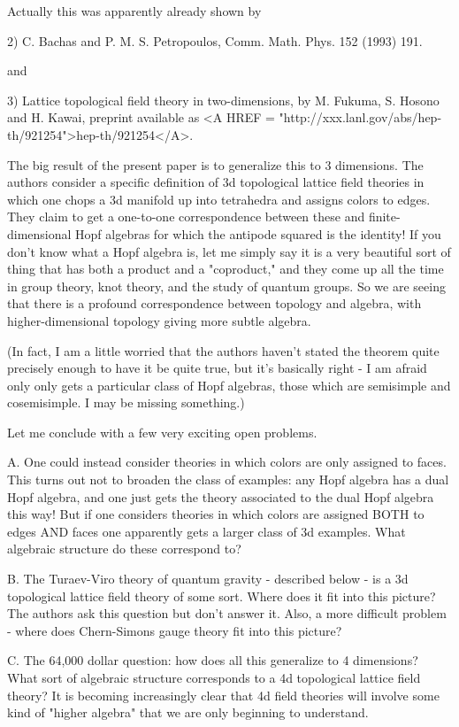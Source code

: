 Actually this was apparently already shown by 

2) C. Bachas and P. M. S. Petropoulos, Comm. Math. Phys. 152 (1993) 191.

and

3) Lattice topological field theory in two-dimensions, by M. Fukuma, S.
Hosono and H. Kawai, preprint available as <A HREF = "http://xxx.lanl.gov/abs/hep-th/921254">hep-th/921254</A>.

The big result of the present paper is to generalize this to 3 dimensions.
The authors consider a specific definition of 3d topological lattice
field theories in which one chops a 3d manifold up into tetrahedra and
assigns colors to edges.  They claim to get a one-to-one correspondence 
between these and finite-dimensional Hopf algebras for which the
antipode squared is the identity!   If you don't know what a Hopf
algebra is, let me simply say it is a very beautiful sort of thing that
has both a product and a "coproduct," and they come up all the time in
group theory, knot theory, and the study of quantum groups.  So we are
seeing that there is a profound correspondence between topology and
algebra, with higher-dimensional topology giving more subtle algebra.

(In fact, I am a little worried that the authors haven't stated the
theorem quite precisely enough to have it be quite true, but it's
basically right - I am afraid only only gets a particular class of Hopf
algebras, those which are semisimple and cosemisimple.  I may be missing
something.)   

Let me conclude with a few very exciting open problems.

A.  One could instead consider theories in which colors are only
assigned to faces. This turns out not to broaden the class of examples:
any Hopf algebra has a dual Hopf algebra, and one just gets the theory
associated to the dual Hopf algebra this way!  But if one considers
theories in which colors are assigned BOTH to edges AND faces one
apparently gets a larger class of 3d examples.  What algebraic structure
do these correspond to?   

B.  The Turaev-Viro theory of quantum gravity - described below - is a
3d topological lattice field theory of some sort.  Where does it fit
into this picture?  The authors ask this question but don't answer it.
Also, a more difficult problem - where does Chern-Simons gauge theory
fit into this picture? 

C.  The 64,000 dollar question: how does all this generalize to 4
dimensions?  What sort of algebraic structure corresponds to a 4d
topological lattice field theory?  It is becoming increasingly clear
that 4d field theories will involve some kind of "higher algebra" that
we are only beginning to understand.

